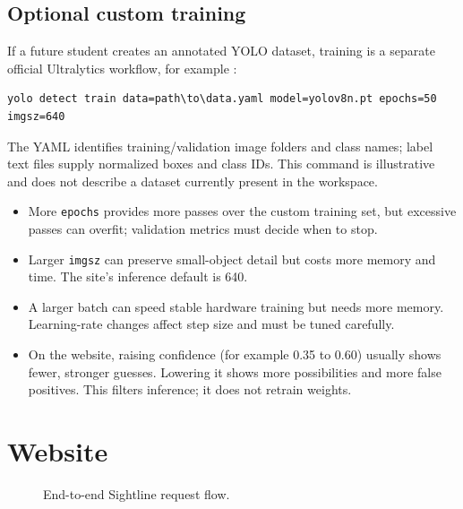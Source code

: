 \documentclass[12pt,a4paper,openany]{report}
\begin{document}
\subsection{Optional custom training}
If a future student creates an annotated YOLO dataset, training is a separate
official Ultralytics workflow, for example \cite{ultralyticsTrain}:
\begin{lstlisting}[style=terminal]
yolo detect train data=path\to\data.yaml model=yolov8n.pt epochs=50 imgsz=640
\end{lstlisting}
The YAML identifies training/validation image folders and class names; label
text files supply normalized boxes and class IDs. This command is illustrative
and does not describe a dataset currently present in the workspace.

\begin{itemize}
  \item More \texttt{epochs} provides more passes over the custom training set,
  but excessive passes can overfit; validation metrics must decide when to stop.
  \item Larger \texttt{imgsz} can preserve small-object detail but costs more
  memory and time. The site's inference default is 640.
  \item A larger batch can speed stable hardware training but needs more memory.
  Learning-rate changes affect step size and must be tuned carefully.
  \item On the website, raising confidence (for example 0.35 to 0.60) usually
  shows fewer, stronger guesses. Lowering it shows more possibilities and more
  false positives. This filters inference; it does not retrain weights.
\end{itemize}

\section{Website}
\begin{figure}[H]
\centering
{}
\caption{End-to-end Sightline request flow.}
\end{figure}
\end{document}

